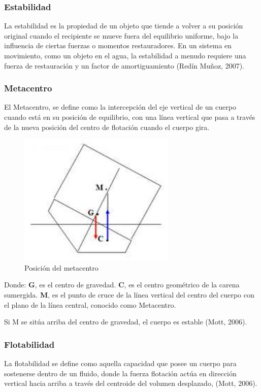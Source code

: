 \documentclass[a4paper,letterpaper]{article}
\begin{document}
\subsubsection*{Estabilidad}
\setlength{\parindent}{18pt}
La estabilidad es la propiedad de un objeto que tiende a volver a su posición original cuando el recipiente 
se mueve fuera del equilibrio uniforme, bajo la influencia de ciertas fuerzas o momentos restauradores. 
En un sistema en movimiento, como un objeto en el agua, la estabilidad a menudo requiere una fuerza de 
restauración y un factor de amortiguamiento (Redín Muñoz, 2007).

\subsubsection*{Metacentro}
\setlength{\parindent}{18pt}
El Metacentro, se define como la intercepción del eje vertical de un cuerpo cuando está en su posición 
de equilibrio, con una línea vertical que pasa a través de la nueva posición del centro de flotación 
cuando el cuerpo gira.
\begin{figure}[h]
	\centering
	\includegraphics[width=0.5 \textwidth]{Metacentrotemporal.jpg}
	\caption{ Posición del metacentro}
	\label{fig:imagen}
\end{figure}
\newline
Donde:
\newline
\textbf{G}, es el centro de gravedad.
\newline
\textbf{C}, es el centro geométrico de la carena sumergida.
\newline
\textbf{M}, es el punto de cruce de la línea vertical del centro del cuerpo con el plano de la línea central, 
conocido como Metacentro.


Si {M} se sitúa arriba del centro de gravedad, el cuerpo es estable (Mott, 2006).
\subsubsection*{Flotabilidad}
\setlength{\parindent}{18pt}
La flotabilidad se define como aquella capacidad que posee un cuerpo para sostenerse dentro de un fluido, 
donde la fuerza flotación actúa en dirección vertical hacia arriba a través del centroide del volumen 
desplazado, (Mott, 2006).
\newpage
\end{document}
